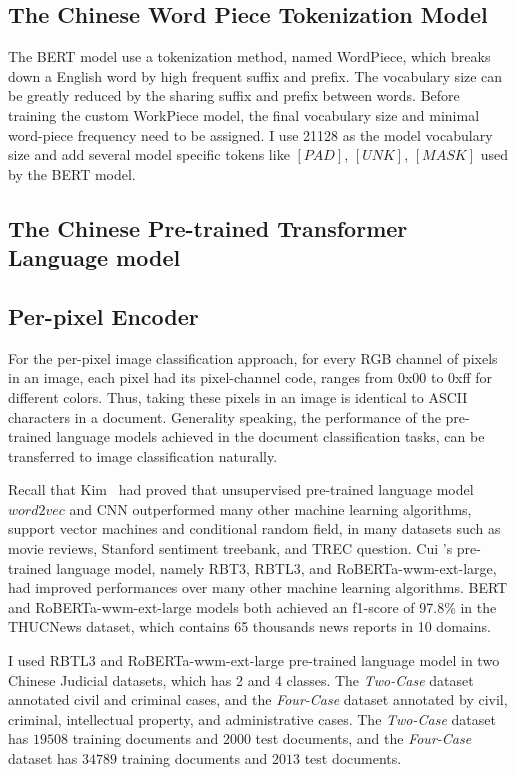 \documentclass[10pt,twocolumn,letterpaper]{article}
\begin{document}
\subsection{The Chinese Word Piece Tokenization Model}

\par The BERT model use a tokenization method, named WordPiece, which breaks down a English word by high frequent suffix and prefix.
The vocabulary size can be greatly reduced by the sharing suffix and prefix between words.
Before training the custom WorkPiece model, the final vocabulary size and minimal word-piece frequency need to be assigned.
I use 21128 as the model vocabulary size and add several model specific tokens like $[PAD]$, $[UNK]$, $[MASK]$ used by the BERT model.


\subsection{The Chinese Pre-trained Transformer Language model}

\subsection{Per-pixel Encoder}

For the per-pixel image classification approach, for every RGB channel of pixels in an image,
each pixel had its pixel-channel code, ranges from 0x00 to 0xff for different colors.
Thus, taking these pixels in an image is identical to ASCII characters in a document.
Generality speaking, the performance of the pre-trained language models achieved in the document classification tasks, can be transferred to image classification naturally.

Recall that Kim~\cite{kim2014convolutional} had proved that unsupervised pre-trained language model $word2vec$ and CNN outperformed many other machine learning algorithms,
\eg support vector machines and conditional random field, in many datasets such as movie reviews, Stanford sentiment treebank, and TREC question.
Cui \etal's pre-trained language model, namely RBT3, RBTL3, and RoBERTa-wwm-ext-large, had improved performances over many other machine learning algorithms.
BERT and RoBERTa-wwm-ext-large models both achieved an f1-score of 97.8\% in the THUCNews dataset, which contains 65 thousands news reports in 10 domains.

I used RBTL3 and RoBERTa-wwm-ext-large pre-trained language model in two Chinese Judicial datasets, which has 2 and 4 classes.
The \textit{Two-Case} dataset annotated civil and criminal cases, and the \textit{Four-Case} dataset annotated by civil, criminal, intellectual property, and administrative cases.
The \textit{Two-Case} dataset has $19508$ training documents and $2000$ test documents, and the \textit{Four-Case} dataset has $34789$ training documents and $2013$ test documents.
\end{document}
